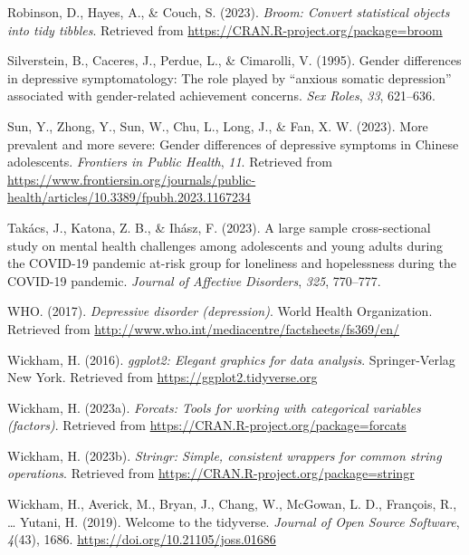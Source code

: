 \documentclass[
  man,floatsintext]{apa6}
\newlength{\cslhangindent}
\newlength{\cslentryspacingunit} %
\newenvironment{CSLReferences}[2] %
 {%
  \setlength{\parindent}{0pt}
  \ifodd #1
  \let\oldpar\par
  \def\par{\hangindent=\cslhangindent\oldpar}
  \fi
  \setlength{\parskip}{#2\cslentryspacingunit}
 }%
 {}
\begin{document}
\begin{CSLReferences}{1}{0}
\leavevmode{}%
Robinson, D., Hayes, A., \& Couch, S. (2023). \emph{Broom: Convert statistical objects into tidy tibbles}. Retrieved from \url{https://CRAN.R-project.org/package=broom}

\leavevmode{}%
Silverstein, B., Caceres, J., Perdue, L., \& Cimarolli, V. (1995). Gender differences in depressive symptomatology: The role played by {``anxious somatic depression''} associated with gender-related achievement concerns. \emph{Sex Roles}, \emph{33}, 621--636.

\leavevmode{}%
Sun, Y., Zhong, Y., Sun, W., Chu, L., Long, J., \& Fan, X. W. (2023). More prevalent and more severe: Gender differences of depressive symptoms in {Chinese} adolescents. \emph{Frontiers in Public Health}, \emph{11}. Retrieved from \url{https://www.frontiersin.org/journals/public-health/articles/10.3389/fpubh.2023.1167234}

\leavevmode{}%
Takács, J., Katona, Z. B., \& Ihász, F. (2023). A large sample cross-sectional study on mental health challenges among adolescents and young adults during the COVID-19 pandemic at-risk group for loneliness and hopelessness during the COVID-19 pandemic. \emph{Journal of Affective Disorders}, \emph{325}, 770--777.

\leavevmode{}%
WHO. (2017). \emph{Depressive disorder (depression)}. World Health Organization. Retrieved from \url{http://www.who.int/mediacentre/factsheets/fs369/en/}

\leavevmode{}%
Wickham, H. (2016). \emph{ggplot2: Elegant graphics for data analysis}. Springer-Verlag New York. Retrieved from \url{https://ggplot2.tidyverse.org}

\leavevmode{}%
Wickham, H. (2023a). \emph{Forcats: Tools for working with categorical variables (factors)}. Retrieved from \url{https://CRAN.R-project.org/package=forcats}

\leavevmode{}%
Wickham, H. (2023b). \emph{Stringr: Simple, consistent wrappers for common string operations}. Retrieved from \url{https://CRAN.R-project.org/package=stringr}

\leavevmode{}%
Wickham, H., Averick, M., Bryan, J., Chang, W., McGowan, L. D., François, R., \ldots{} Yutani, H. (2019). Welcome to the {tidyverse}. \emph{Journal of Open Source Software}, \emph{4}(43), 1686. \url{https://doi.org/10.21105/joss.01686}


\end{CSLReferences}
\end{document}

